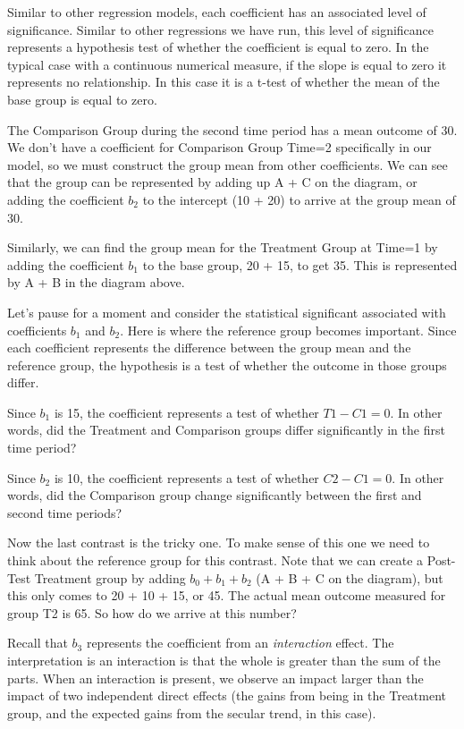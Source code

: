 \documentclass[]{book}
\theoremstyle{definition}
\theoremstyle{definition}
\theoremstyle{definition}
\theoremstyle{remark}
\begin{document}
Similar to other regression models, each coefficient has an associated
level of significance. Similar to other regressions we have run, this
level of significance represents a hypothesis test of whether the
coefficient is equal to zero. In the typical case with a continuous
numerical measure, if the slope is equal to zero it represents no
relationship. In this case it is a t-test of whether the mean of the
base group is equal to zero.

The Comparison Group during the second time period has a mean outcome of
30. We don't have a coefficient for Comparison Group Time=2 specifically
in our model, so we must construct the group mean from other
coefficients. We can see that the group can be represented by adding up
A + C on the diagram, or adding the coefficient \(b_{2}\) to the
intercept (10 + 20) to arrive at the group mean of 30.

Similarly, we can find the group mean for the Treatment Group at Time=1
by adding the coefficient \(b_{1}\) to the base group, 20 + 15, to get
35. This is represented by A + B in the diagram above.

Let's pause for a moment and consider the statistical significant
associated with coefficients \(b_{1}\) and \(b_{2}\). Here is where the
reference group becomes important. Since each coefficient represents the
difference between the group mean and the reference group, the
hypothesis is a test of whether the outcome in those groups differ.

Since \(b_{1}\) is 15, the coefficient represents a test of whether
\(T1 - C1 = 0\). In other words, did the Treatment and Comparison groups
differ significantly in the first time period?

Since \(b_{2}\) is 10, the coefficient represents a test of whether
\(C2 - C1 = 0\). In other words, did the Comparison group change
significantly between the first and second time periods?

Now the last contrast is the tricky one. To make sense of this one we
need to think about the reference group for this contrast. Note that we
can create a Post-Test Treatment group by adding
\(b_{0} + b_{1} + b_{2}\) (A + B + C on the diagram), but this only
comes to 20 + 10 + 15, or 45. The actual mean outcome measured for group
T2 is 65. So how do we arrive at this number?

Recall that \(b_{3}\) represents the coefficient from an
\emph{interaction} effect. The interpretation is an interaction is that
the whole is greater than the sum of the parts. When an interaction is
present, we observe an impact larger than the impact of two independent
direct effects (the gains from being in the Treatment group, and the
expected gains from the secular trend, in this case).
\end{document}
